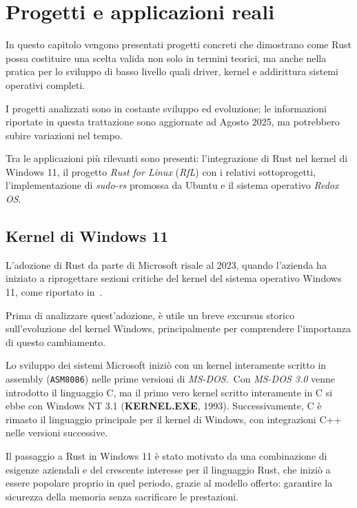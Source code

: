 
\chapter{Progetti e applicazioni reali}\label{cap:05}

In questo capitolo vengono presentati progetti concreti che dimostrano
come Rust possa costituire una scelta valida non solo in termini teorici, ma anche nella pratica per lo sviluppo 
di basso livello quali driver, kernel e addirittura sistemi operativi completi.

I progetti analizzati sono in costante sviluppo ed evoluzione;
le informazioni riportate in questa trattazione sono aggiornate ad Agosto 2025, ma potrebbero subire
variazioni nel tempo.

Tra le applicazioni più rilevanti sono presenti: l'integrazione di Rust nel kernel di Windows 11,
il progetto \textit{Rust for Linux} (\textit{RfL}) con i relativi sottoprogetti, l'implementazione 
di \textit{sudo-rs} promossa da Ubuntu e il sistema operativo \textit{Redox OS}.\ 

\section{Kernel di Windows 11}
L'adozione di Rust da parte di Microsoft risale al 2023, quando l'azienda ha iniziato a riprogettare sezioni critiche del
kernel del sistema operativo Windows 11, come riportato in~\cite{microsoft-rust}.

Prima di analizzare quest'adozione, è utile un breve excursus storico sull'evoluzione del kernel Windows, principalmente per comprendere l'importanza di questo cambiamento.
\begin{framed}
\noindent Lo sviluppo dei sistemi Microsoft iniziò con un kernel interamente scritto in assembly (\texttt{ASM8086}) nelle prime 
versioni di \textit{MS-DOS}.\ Con \textit{MS-DOS 3.0} venne introdotto il linguaggio C, ma il primo vero kernel scritto interamente in C
si ebbe con Windows NT 3.1 (\textbf{KERNEL.EXE}, 1993). Successivamente, C è rimasto il linguaggio principale per il kernel di Windows, con integrazioni C++ nelle
versioni successive.
\end{framed}
\noindent Il passaggio a Rust in Windows 11 è stato motivato da una combinazione di esigenze aziendali e del crescente interesse per il linguaggio Rust, che
iniziò a essere popolare proprio in quel periodo, grazie al modello offerto: garantire la sicurezza della memoria senza sacrificare le prestazioni.

